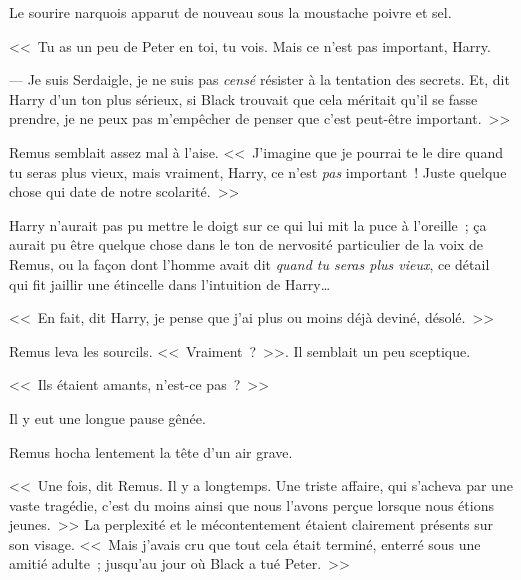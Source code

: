Le sourire narquois apparut de nouveau sous la moustache poivre et sel.

<<~Tu as un peu de Peter en toi, tu vois. Mais ce n'est pas important, Harry.

--- Je suis Serdaigle, je ne suis pas \emph{censé} résister à la tentation des secrets. Et, dit Harry d'un ton plus sérieux, si Black trouvait que cela méritait qu'il se fasse prendre, je ne peux pas m'empêcher de penser que c'est peut-être important.~>>

Remus semblait assez mal à l'aise. <<~J'imagine que je pourrai te le dire quand tu seras plus vieux, mais vraiment, Harry, ce n'est \emph{pas} important~! Juste quelque chose qui date de notre scolarité.~>>

Harry n'aurait pas pu mettre le doigt sur ce qui lui mit la puce à l'oreille~; ça aurait pu être quelque chose dans le ton de nervosité particulier de la voix de Remus, ou la façon dont l'homme avait dit \emph{quand tu seras plus vieux}, ce détail qui fit jaillir une étincelle dans l'intuition de Harry…

<<~En fait, dit Harry, je pense que j'ai plus ou moins déjà deviné, désolé.~>>

Remus leva les sourcils. <<~Vraiment~?~>>. Il semblait un peu sceptique.

<<~Ils étaient amants, n'est-ce pas~?~>>

Il y eut une longue pause gênée.

Remus hocha lentement la tête d'un air grave.

<<~Une fois, dit Remus. Il y a longtemps. Une triste affaire, qui s'acheva par une vaste tragédie, c'est du moins ainsi que nous l'avons perçue lorsque nous étions jeunes.~>> La perplexité et le mécontentement étaient clairement présents sur son visage. <<~Mais j'avais cru que tout cela était terminé, enterré sous une amitié adulte~; jusqu'au jour où Black a tué Peter.~>> 

